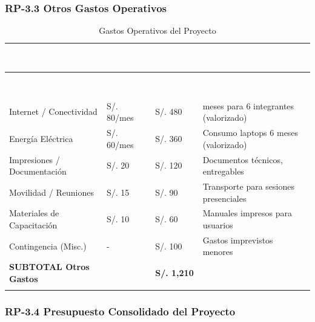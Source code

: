 \documentclass[12pt,a4paper]{article}
\begin{document}
\subsubsection{RP-3.3 Otros Gastos Operativos}

\begin{longtable}{|>{\raggedright\arraybackslash}p{5cm}|>{\centering\arraybackslash}p{2cm}|>{\centering\arraybackslash}p{2cm}|>{\raggedright\arraybackslash}p{5cm}|}
\hline
\rowcolor{headercolor}
\textcolor{white}{\textbf{Concepto}} & \textcolor{white}{\textbf{Costo Unit.}} & \textcolor{white}{\textbf{Costo Total}} & \textcolor{white}{\textbf{Descripción}} \\
\hline
\endfirsthead
\hline
\rowcolor{headercolor}
\textcolor{white}{\textbf{Concepto}} & \textcolor{white}{\textbf{Costo Unit.}} & \textcolor{white}{\textbf{Costo Total}} & \textcolor{white}{\textbf{Descripción}} \\
\hline
\endhead
\hline
\endlastfoot

Internet / Conectividad & S/. 80/mes & S/. 480 & 6 meses para 6 integrantes (valorizado) \\
\hline
\rowcolor{rowgray}
Energía Eléctrica & S/. 60/mes & S/. 360 & Consumo laptops 6 meses (valorizado) \\
\hline
Impresiones / Documentación & S/. 20 & S/. 120 & Documentos técnicos, entregables \\
\hline
\rowcolor{rowgray}
Movilidad / Reuniones & S/. 15 & S/. 90 & Transporte para sesiones presenciales \\
\hline
Materiales de Capacitación & S/. 10 & S/. 60 & Manuales impresos para usuarios \\
\hline
\rowcolor{rowgray}
Contingencia (Misc.) & - & S/. 100 & Gastos imprevistos menores \\
\hline
\textbf{SUBTOTAL Otros Gastos} & & \textbf{S/. 1,210} & \\
\hline
\caption{Gastos Operativos del Proyecto}
\end{longtable}

\subsubsection{RP-3.4 Presupuesto Consolidado del Proyecto}
\end{document}
